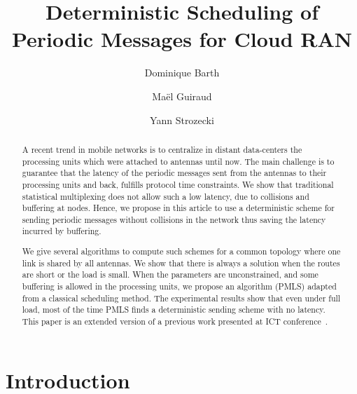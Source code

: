 \documentclass[10pt, conference, letterpaper]{IEEEtran}
\title{Deterministic Scheduling of Periodic Messages for Cloud RAN}
\author[1]{Dominique Barth}
\author[1,2]{Ma\"el Guiraud}
\author[1]{Yann Strozecki}
\affil[1]{David Laboratory, UVSQ}
\affil[2]{Nokia Bell Labs France}
\begin{document}
\maketitle

\begin{abstract}
A recent trend in mobile networks is to centralize in distant data-centers the processing units which were attached to 
antennas until now. The main challenge is to guarantee that the latency of the periodic messages sent from the antennas to their processing units and back, fulfills protocol time constraints. We show that traditional statistical multiplexing does not allow such a low latency, due to collisions and buffering at nodes. Hence, we propose in this article to use a deterministic scheme for sending periodic messages without collisions in the network thus saving the latency incurred by buffering.

We give several algorithms to compute such schemes for a common topology where one link is shared by all antennas.
We show that there is always a solution when the routes are short or the load is small. When the parameters are unconstrained,
and some buffering is allowed in the processing units, we propose an algorithm (PMLS) adapted from a classical scheduling method.
The experimental results show that even under full load, most of the time PMLS finds a deterministic sending scheme with no latency.
This paper is an extended version of a previous work presented at ICT conference~\cite{Guir1806:Deterministic}.
\end{abstract}


\section{Introduction}
\end{document}
